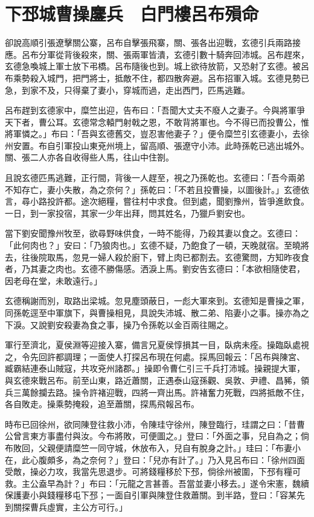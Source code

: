 
\chapter{下邳城曹操鏖兵　白門樓呂布殞命}

卻說高順引張遼擊關公寨，呂布自擊張飛寨，關、張各出迎戰，玄德引兵兩路接應。呂布分軍從背後殺來，關、張兩軍皆潰，玄德引數十騎奔回沛城。呂布趕來，玄德急喚城上軍士放下弔橋。呂布隨後也到。城上欲待放箭，又恐射了玄德。被呂布乘勢殺入城門，把門將士，抵敵不住，都四散奔避。呂布招軍入城。玄德見勢已急，到家不及，只得棄了妻小，穿城而過，走出西門，匹馬逃難。

呂布趕到玄德家中，糜竺出迎，告布曰：「吾聞大丈夫不廢人之妻子。今與將軍爭天下者，曹公耳。玄德常念轅門射戟之恩，不敢背將軍也。今不得已而投曹公，惟將軍憐之。」布曰：「吾與玄德舊交，豈忍害他妻子？」便令糜竺引玄德妻小，去徐州安置。布自引軍投山東兗州境上，留高順、張遼守小沛。此時孫乾已逃出城外。關、張二人亦各自收得些人馬，往山中住劄。

且說玄德匹馬逃難，正行間，背後一人趕至，視之乃孫乾也。玄德曰：「吾今兩弟不知存亡，妻小失散，為之奈何？」孫乾曰：「不若且投曹操，以圖後計。」玄德依言，尋小路投許都。途次絕糧，嘗往村中求食。但到處，聞劉豫州，皆爭進飲食。一日，到一家投宿，其家一少年出拜，問其姓名，乃獵戶劉安也。

當下劉安聞豫州牧至，欲尋野味供食，一時不能得，乃殺其妻以食之。玄德曰：「此何肉也？」安曰：「乃狼肉也。」玄德不疑，乃飽食了一頓，天晚就宿。至曉將去，往後院取馬，忽見一婦人殺於廚下，臂上肉已都割去。玄德驚問，方知昨夜食者，乃其妻之肉也。玄德不勝傷感。洒淚上馬。劉安告玄德曰：「本欲相隨使君，因老母在堂，未敢遠行。」

玄德稱謝而別，取路出梁城。忽見塵頭蔽日，一彪大軍來到。玄德知是曹操之軍，同孫乾逕至中軍旗下，與曹操相見，具說失沛城、散二弟、陷妻小之事。操亦為之下淚。又說劉安殺妻為食之事，操乃令孫乾以金百兩往賜之。

軍行至濟北，夏侯淵等迎接入寨，備言兄夏侯惇損其一目，臥病未痊。操臨臥處視之，令先回許都調理；一面使人打探呂布現在何處。採馬回報云：「呂布與陳宮、臧霸結連泰山賊寇，共攻兗州諸郡。」操即令曹仁引三千兵打沛城。操親提大軍，與玄德來戰呂布。前至山東，路近蕭關，正遇泰山寇孫觀、吳敦、尹禮、昌豨，領兵三萬餘攔去路。操令許褚迎戰，四將一齊出馬。許褚奮力死戰，四將抵敵不住，各自敗走。操乘勢掩殺，追至蕭關，探馬飛報呂布。

時布已回徐州，欲同陳登往救小沛，令陳珪守徐州，陳登臨行，珪謂之曰：「昔曹公曾言東方事盡付與汝。今布將敗，可便圖之。」登曰：「外面之事，兒自為之；倘布敗回，父親便請糜竺一同守城，休放布入，兒自有脫身之計。」珪曰：「布妻小在，此心腹頗多，為之奈何？」登曰：「兒亦有計了。」乃入見呂布曰：「徐州四面受敵，操必力攻，我當先思退步。可將錢糧移於下邳，倘徐州被圍，下邳有糧可救。主公盍早為計？」布曰：「元龍之言甚善。吾當並妻小移去。」遂令宋憲，魏續保護妻小與錢糧移屯下邳；一面自引軍與陳登住救蕭關。到半路，登曰：「容某先到關探曹兵虛實，主公方可行。」


